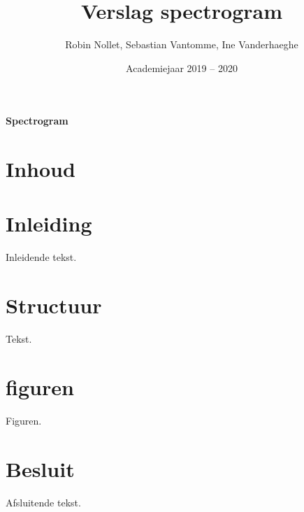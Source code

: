 \documentclass[a4paper,kul]{kulakarticle} %
\date{Academiejaar 2019 -- 2020}
\title{Verslag spectrogram}
\author{Robin Nollet, Sebastian Vantomme, Ine Vanderhaeghe}
\begin{document}
	
\maketitle
	
\begin{center}
	\centering
	\vspace*{\fill}
	\huge
	\textbf{Spectrogram}
	\vspace*{\fill}
\end{center}
	
\newpage

\section{Inhoud}
	
\tableofcontents

\newpage

\section{Inleiding}

Inleidende tekst.

\section{Structuur}

Tekst.

\section{figuren}

Figuren.

\section{Besluit}

Afsluitende tekst.
\end{document}

